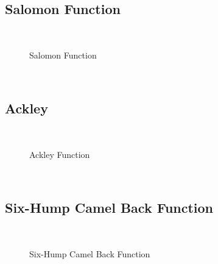 \subsection{Salomon Function}
~
\begin{figure}[ht]
	\centering
	\setlength \fboxsep{0pt}
	\setlength \fboxrule{0.5pt}
	\caption{Salomon Function}
	\label{fig:SalomonGraph}
\end{figure}
~
\subsection{Ackley}
~
\begin{figure}[ht]
	\centering
	\setlength \fboxsep{0pt}
	\setlength \fboxrule{0.5pt}
	\caption{Ackley Function}
	\label{fig:AckleyGraph}
\end{figure}
~
\subsection{Six-Hump Camel Back Function}
~
\begin{figure}[ht]
	\centering
	\setlength \fboxsep{0pt}
	\setlength \fboxrule{0.5pt}
	\caption{Six-Hump Camel Back Function}
	\label{fig:CamelGraph}
\end{figure}
~
